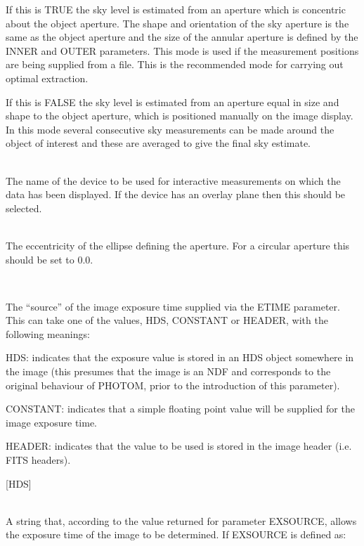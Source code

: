 \documentclass[twoside,11pt]{article}
\renewcommand{\_}{\texttt{\symbol{95}}}
\newcommand{\sstsubsection}[1]{ \item[{#1}] \mbox{} \\}
\newcommand{\sstsubsection}[1]{\item[{#1}]}
\begin{document}
{{{         If this is TRUE the sky level is estimated from an aperture
         which is concentric about the object aperture. The shape and
         orientation of the sky aperture is the same as the object
         aperture and the size of the annular aperture is defined by the
         INNER and OUTER parameters. This mode is used if the
         measurement positions are being supplied from a file. This is
        the recommended mode for carrying out optimal extraction.

         If this is FALSE the sky level is estimated from an aperture
         equal in size and shape to the object aperture, which is
         positioned manually on the image display. In this mode several
         consecutive sky measurements can be made around the object of
         interest and these are averaged to give the final sky estimate.
      }
      \sstsubsection{
         DEVICE = DEVICE (Read)
      }{
         The name of the device to be used for interactive measurements
         on which the data has been displayed. If the device has an
         overlay plane then this should be selected.
      }
      \sstsubsection{
         ECCEN = \_REAL (Read)
      }{
         The eccentricity of the ellipse defining the aperture. For a
         circular aperture this should be set to 0.0.
      }
      \sstsubsection{
         EXSOURCE = LITERAL (Read)
      }{
        The ``source'' of the image exposure time supplied via the ETIME
        parameter. This can take one of the values, HDS, CONSTANT or
        HEADER, with the following meanings:
        \begin{description}
        \item{HDS:} indicates that the exposure value is stored in an HDS
          object somewhere in the image (this presumes that the image is
          an NDF and corresponds to the original behaviour of PHOTOM,
          prior to the introduction of this parameter).
        \item{CONSTANT:} indicates that a simple floating point value will be
          supplied for the image exposure time.
        \item{HEADER:} indicates that the value to be used is stored in the
          image header (i.e. FITS headers).
        \end{description}
        [HDS]
      }
      \sstsubsection{
         ETIME = LITERAL (Read)
      }{
        A string that, according to the value returned for parameter
        EXSOURCE, allows the exposure time of the image to be
        determined. If EXSOURCE is defined as:
}}}
\end{document}
